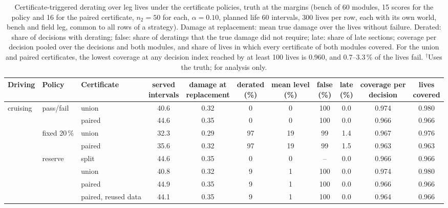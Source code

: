 \begin{table}[htbp]
\centering
\caption{Certificate-triggered derating over leg lives under the certificate policies, truth at the margins (bench of 60
modules, 15 scores for the policy and 16 for the paired certificate, $n_2=50$ for each, $\alpha=0.10$, planned life 60
intervals, 300 lives per row, each with its own world, bench and field leg, common to all rows of a strategy). Damage at
replacement: mean true damage over the lives without failure. Derated: share of decisions with derating; false: share
of deratings that the true damage did not require; late: share of late sections; coverage per decision pooled over the
decisions and both modules, and share of lives in which every certificate of both modules covered. For the union and paired certificates, the lowest coverage at any decision index reached by at least 100 lives is 0.960, and 0.7--3.3\,\% of the lives fail. $^{\dagger}$Uses the truth; for analysis only.}
\label{tab:S5}
\scriptsize
\setlength{\tabcolsep}{3pt}
\begin{tabular*}{\textwidth}{@{\extracolsep{\fill}}lllcccccccc@{}}
\toprule
Driving & Policy & Certificate & \makecell{served\\intervals} & \makecell{damage at\\replacement}
& \makecell{derated\\(\%)} & \makecell{mean level\\(\%)} & \makecell{false\\(\%)} & \makecell{late\\(\%)} &
\makecell{coverage per\\decision} & \makecell{lives\\covered} \\
\midrule
cruising & pass/fail & union & 40.6 & 0.32 & 0 & 0 & 100 & 0.0 & 0.974 & 0.980 \\
 &  & paired & 44.6 & 0.35 & 0 & 0 & 100 & 0.0 & 0.966 & 0.966 \\
 & fixed 20\,\% & union & 32.3 & 0.29 & 97 & 19 & 99 & 1.4 & 0.967 & 0.976 \\
 &  & paired & 35.6 & 0.32 & 97 & 19 & 99 & 1.5 & 0.963 & 0.963 \\
 & reserve & split & 44.6 & 0.35 & 0 & 0 & -- & 0.0 & 0.966 & 0.966 \\
 &  & union & 40.8 & 0.32 & 9 & 1 & 100 & 0.0 & 0.974 & 0.980 \\
 &  & paired & 44.9 & 0.35 & 9 & 1 & 100 & 0.0 & 0.966 & 0.966 \\
 &  & paired, reused data & 44.1 & 0.35 & 9 & 1 & 100 & 0.0 & 0.964 & 0.966 \\

\end{tabular*}
\end{table}

